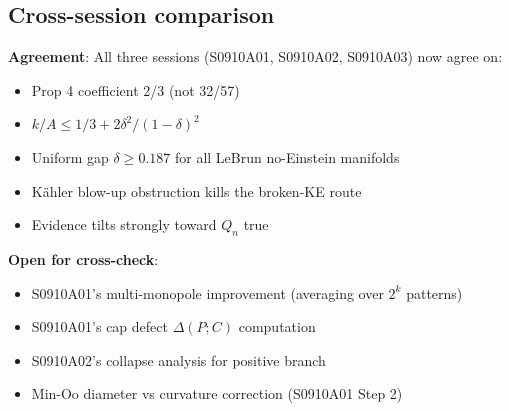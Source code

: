 \subsection{Cross-session comparison}

\textbf{Agreement}: All three sessions (S0910A01, S0910A02, S0910A03) now agree on:
\begin{itemize}
\item Prop 4 coefficient 2/3 (not 32/57)
\item $k/A \leq 1/3 + 2\delta^2/(1-\delta)^2$
\item Uniform gap $\delta \geq 0.187$ for all LeBrun no-Einstein manifolds
\item K\"ahler blow-up obstruction kills the broken-KE route
\item Evidence tilts strongly toward $Q_n$ true
\end{itemize}

\textbf{Open for cross-check}: 
\begin{itemize}
\item S0910A01's multi-monopole improvement (averaging over $2^k$ patterns)
\item S0910A01's cap defect $\Delta(P;C)$ computation
\item S0910A02's collapse analysis for positive branch
\item Min-Oo diameter vs curvature correction (S0910A01 Step 2)
\end{itemize}
